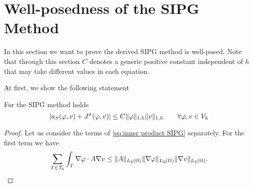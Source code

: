 \section{Well-posedness of the SIPG Method}

In this section we want to prove the derived SIPG method is well-posed.
Note that through this section $C$ denotes a generic positive constant independent of $h$ that may take different values in each equation.

At first, we show the following statement
\begin{lemma}\label{la: SIPG continuous}
	For the SIPG method holds
	\[
		|a_S(\varphi, v) + J^\sigma(\varphi,v)| \leq C \lVert \varphi \rVert_{1,h} \lVert v \rVert_{1,h} \qquad \forall \varphi,v \in V_h
	\]
\end{lemma}
\begin{proof}
Let us consider the terms of \eqref{eq:inner product SIPG} separately.
For the first term we have
\begin{align}
	\sum\limits_{T \in \mathcal{T}_h} \int_T \nabla \varphi \cdot A \nabla v \leq \lVert A \rVert_{L_2(\Omega)}  \lVert \nabla \varphi \rVert_{L_2(\Omega)} \lVert \nabla v \rVert_{L_2(\Omega)}. \label{eq: estimate first term}
\end{align}


\end{proof}
